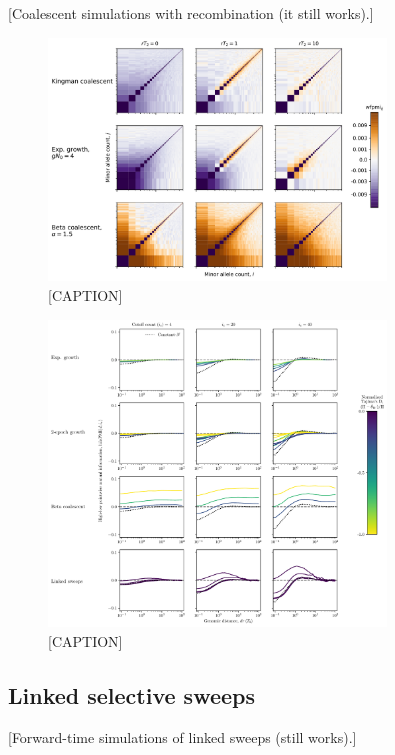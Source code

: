 \documentclass[11pt, letterpaper]{article}   	%
\begin{document}
[Coalescent simulations with recombination (it still works).]

\begin{figure}
\centering
\includegraphics[width=0.8\textwidth]{figures/figure4.pdf}
\caption{[CAPTION] \label{fig:wpmi_recombination}}
\end{figure}

\begin{figure}
\centering
\includegraphics[width=0.8\textwidth]{figures/figure5.pdf}
\caption{[CAPTION] \label{fig:hilo_vs_d}}
\end{figure}

\subsection*{Linked selective sweeps}

[Forward-time simulations of linked sweeps (still works).]
\end{document}
